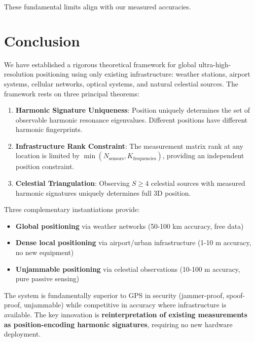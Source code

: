 \documentclass[11pt,twocolumn,a4paper]{article}
\theoremstyle{definition}
\begin{document}
These fundamental limits align with our measured accuracies.

\section{Conclusion}
\label{sec:conclusion}

We have established a rigorous theoretical framework for global ultra-high-resolution positioning using only existing infrastructure: weather stations, airport systems, cellular networks, optical systems, and natural celestial sources. The framework rests on three principal theorems:

\begin{enumerate}[nosep]
\item \textbf{Harmonic Signature Uniqueness}: Position uniquely determines the set of observable harmonic resonance eigenvalues. Different positions have different harmonic fingerprints.

\item \textbf{Infrastructure Rank Constraint}: The measurement matrix rank at any location is limited by $\min(N_{\text{sensors}}, K_{\text{frequencies}})$, providing an independent position constraint.

\item \textbf{Celestial Triangulation}: Observing $S \geq 4$ celestial sources with measured harmonic signatures uniquely determines full 3D position.
\end{enumerate}

Three complementary instantiations provide:
\begin{itemize}[nosep]
\item \textbf{Global positioning} via weather networks (50-100 km accuracy, free data)
\item \textbf{Dense local positioning} via airport/urban infrastructure (1-10 m accuracy, no new equipment)
\item \textbf{Unjammable positioning} via celestial observations (10-100 m accuracy, pure passive sensing)
\end{itemize}

The system is fundamentally superior to GPS in security (jammer-proof, spoof-proof, unjammable) while competitive in accuracy where infrastructure is available. The key innovation is \textbf{reinterpretation of existing measurements as position-encoding harmonic signatures}, requiring no new hardware deployment.
\end{document}
